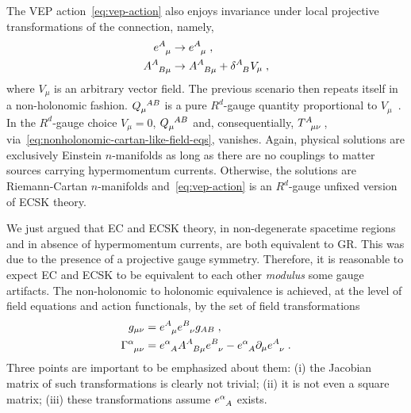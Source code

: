 \documentclass[../../main.tex]{subfiles}
\begin{document}
The VEP action~\eqref{eq:vep-action} also enjoys invariance under local projective transformations of the connection, namely,
\begin{subequations}\label{eq:nonholonomic-projective-transformation}
  \begin{align}
    \tensor{e}{^A_\mu}    & \rightarrow \tensor{e}{^A_\mu} \;, \label{eq:projective-transf-vielbein}                                 \\
    \tensor{A}{^A_{B\mu}} & \rightarrow \tensor{A}{^A_{B\mu}}+\tensor{\delta}{^A_B}V_\mu \;, \label{eq:projective-transf-connection}
  \end{align}
\end{subequations}
where $V_\mu$ is an arbitrary vector field. The previous scenario then repeats itself in a non-holonomic fashion. $\tensor{Q}{_\mu^{AB}}$ is a pure $R^d$-gauge quantity proportional to $V_\mu$~\cite{dadhich2012}. In the $R^d$-gauge choice $V_\mu=0$, $\tensor{Q}{_\mu^{AB}}$ and, consequentially, $\tensor{T}{^A_{\mu\nu}}$, via~\eqref{eq:nonholonomic-cartan-like-field-eqs}, vanishes. Again, physical solutions are exclusively Einstein $n$-manifolds as long as there are no couplings to matter sources carrying hypermomentum currents. Otherwise, the solutions are Riemann-Cartan $n$-manifolds and~\eqref{eq:vep-action} is an $ R^{ d } $-gauge unfixed version of ECSK theory.

We just argued that EC and ECSK theory, in non-degenerate spacetime regions and in absence of hypermomentum currents, are both equivalent to GR\@. This was due to the presence of a projective gauge symmetry. Therefore, it is reasonable to expect EC and ECSK to be equivalent to each other \textit{modulus} some gauge artifacts. The non-holonomic to holonomic equivalence is achieved, at the level of field equations and action functionals, by the set of field transformations
\begin{subequations}\label{eq:field-transformation}
  \begin{align}
    g_{\mu\nu}                        & = \tensor{e}{^A_\mu}\tensor{e}{^B_\nu}g_{AB} \;, \label{eq:metrics}                                                                          \\
    \tensor{\Gamma}{^\alpha_{\mu\nu}} & = \tensor{e}{^\alpha_A}\tensor{A}{^A_{B\mu}}\tensor{e}{^B_\nu}-\tensor{e}{^\alpha_A}\partial_\mu\tensor{e}{^A_\nu}\;. \label{eq:connections}
  \end{align}
\end{subequations}
Three points are important to be emphasized about them: (i) the Jacobian matrix of such transformations is clearly not trivial; (ii) it is not even a square matrix; (iii) these transformations assume $\tensor{e}{^\alpha_A}$ exists.
\end{document}
